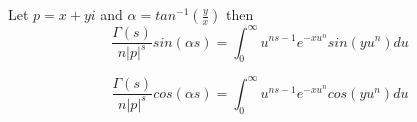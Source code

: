 \documentclass[a4paper]{article}
\begin{document}
    \begin{theorem}
        Let
        $p = x + yi$ and
        $\alpha =tan^{-1} \left( \frac{y}{x} \right)$ then
        \begin{equation}
            \label{eq:sin-gamma-integral}
            \boxed{
                \frac{\Gamma(s)}{n |p|^s} sin(\alpha s)= \int_{0}^{\infty} u^{ns -1} e^{-x u^{n}} sin(y u^n) du
            }
        \end{equation}

        \begin{equation}
            \label{eq:cos-gamma-integral}
            \boxed{
                \frac{\Gamma(s)}{n |p|^s} cos(\alpha s)= \int_{0}^{\infty} u^{ns -1} e^{-x u^{n}} cos(y u^n) du
            }
        \end{equation}


\end{theorem}
\end{document}
